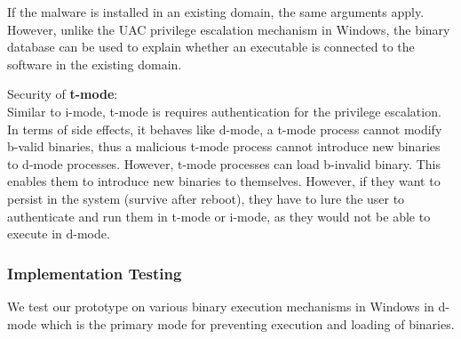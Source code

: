 If the malware is installed in an existing domain,
the same arguments apply. However, unlike the UAC privilege escalation
mechanism in Windows, the binary database can be used to explain 
whether an executable is connected to the software in the existing domain.
% 
\medskip

\noindent
Security of {\bf t-mode}: \\
Similar to i-mode, t-mode is requires authentication for the 
privilege escalation.
In terms of side effects, it behaves like d-mode, a t-mode process 
cannot modify b-valid binaries,
thus a malicious t-mode process cannot introduce new binaries to d-mode
processes.
However, t-mode processes can load b-invalid binary.
This enables them to introduce new binaries to themselves.
However, if they want to persist in the system (survive after reboot),
they have to lure the user to authenticate and run them in t-mode or i-mode,
as they would not be able to execute in d-mode.


\subsubsection{Implementation Testing}

We test our prototype on various binary execution mechanisms in Windows
in d-mode which is the primary mode
for preventing execution and loading of binaries.


